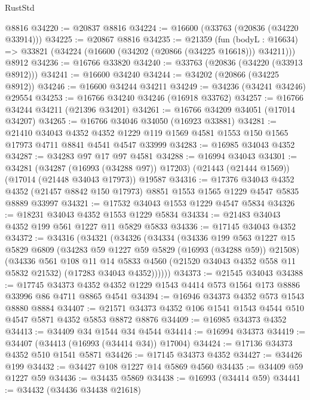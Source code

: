 \begin{lexlean}{RustStd}
\begin{coremodule}
    @8816
@34220 := @20837 @8816
@34224 := @16600 (@33763 (@20836 (@34220 @33914)))
@34225 := @20867 @8816
@34235 := @21359
    (fun (bodyL : @16634) => @33821 (@34224 (@16600 (@34202 (@20866 (@34225 @16618))) @34211)))
    @8912
@34236 := @16766 @33820
@34240 := @33763 (@20836 (@34220 (@33913 @8912)))
@34241 := @16600 @34240
@34244 := @34202 (@20866 (@34225 @8912))
@34246 := @16600 @34244 @34211
@34249 := @34236 (@34241 @34246) @29554
@34253 := @16766 @34240 @34246 (@16918 @33762)
@34257 := @16766 @34244 @34211 (@21396 @34201)
@34261 := @16766 @34209 @34051 (@17014 @34207)
@34265 := @16766 @34046 @34050 (@16923 @33881)
@34281 := @21410
    @34043
    @4352
    @4352
    @1229
    @119
    @1569
    @4581
    @1553
    @150
    @1565
    @17973
    @4711
    @8841
    @4541
    @4547
    @33999
@34283 := @16985 @34043 @4352
@34287 := @34283 @97 @17 @97 @4581
@34288 := @16994 @34043
@34301 := @34281
    (@34287 (@16993 (@34288 @97)) @17203)
    (@21443 (@21444 @1569))
    (@17014 (@21448 @34043 @17973))
    @19587
@34316 := @17376
    @34043
    @4352
    @4352
    (@21457 @8842 @150 @17973)
    @8851
    @1553
    @1565
    @1229
    @4547
    @5835
    @8889
    @33997
@34321 := @17532 @34043 @1553 @1229 @4547 @5834
@34326 := @18231 @34043 @4352 @1553 @1229 @5834
@34334 := @21483 @34043 @4352 @199 @561 @1227 @11 @5829 @5833
@34336 := @17145 @34043 @4352
@34372 := @34316
    (@34321
      (@34326
        (@34334
          (@34336
            @199
            @563
            @1227
            @15
            @5829
            @6809
            (@34283 @59 @1227 @59 @5829 (@16993 (@34288 @59)) @21508)
            (@34336
              @561
              @108
              @11
              @14
              @5833
              @4560
              (@21520 @34043 @4352 @558 @11 @5832 @21532)
              (@17283 @34043 @4352))))))
@34373 := @21545 @34043
@34388 := @17745
    @34373
    @4352
    @4352
    @1229
    @1543
    @4414
    @573
    @1564
    @173
    @8886
    @33996
    @86
    @4711
    @8865
    @4541
@34394 := @16946 @34373 @4352 @573 @1543 @8880 @8884
@34407 := @21571 @34373 @4352 @106 @1541 @1543 @4544 @510 @4547 @5871 @4352 @5853 @8872 @8876
@34409 := @16985 @34373 @4352
@34413 := @34409 @34 @1544 @34 @4544
@34414 := @16994 @34373
@34419 := @34407 (@34413 (@16993 (@34414 @34)) @17004)
@34424 := @17136 @34373 @4352 @510 @1541 @5871
@34426 := @17145 @34373 @4352
@34427 := @34426 @199
@34432 := @34427 @108 @1227 @14 @5869 @4560
@34435 := @34409 @59 @1227 @59
@34436 := @34435 @5869
@34438 := @16993 (@34414 @59)
@34441 := @34432 (@34436 @34438 @21618)

\end{coremodule}
\end{lexlean}
